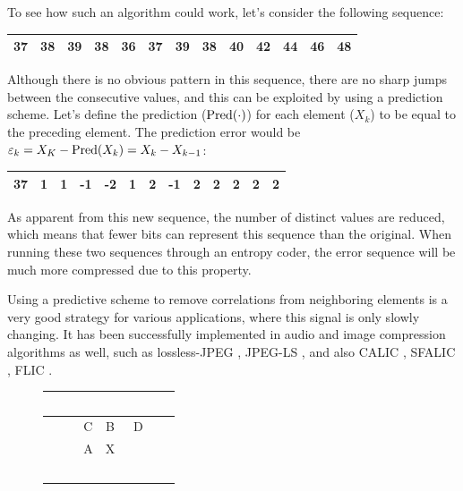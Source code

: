      To see how such an algorithm could work, let's consider the following sequence:
      \begin{center}
        \begin{tabular}{|c|c|c|c|c|c|c|c|c|c|c|c|c|}
          \hline
          37 & 38 & 39 & 38 & 36 & 37 & 39 & 38 & 40 & 42 & 44 & 46 & 48 \\
          \hline
        \end{tabular}
      \end{center}
      Although there is no obvious pattern in this sequence, there are no sharp jumps between the consecutive values, and this can be exploited by using a prediction scheme. Let's define the prediction ($\operatorname{Pred}(\cdot)$) for each element ($X_k$) to be equal to the preceding element. The prediction error would be $\varepsilon_k = X_K - \operatorname{Pred}(X_k) = X_k - X_{k-1}$:
      \begin{center}
        \begin{tabular}{|c|c|c|c|c|c|c|c|c|c|c|c|c|}
          \hline
          37 & 1 & 1 & -1 & -2 & 1 & 2 & -1 & 2 & 2 & 2 & 2 & 2 \\
          \hline
        \end{tabular}
      \end{center}
      As apparent from this new sequence, the number of distinct values are reduced, which means that fewer bits can represent this sequence than the original. When running these two sequences through an entropy coder, the error sequence will be much more compressed due to this property.
      
      Using a predictive scheme to remove correlations from neighboring elements is a very good strategy for various applications, where this signal is only slowly changing. It has been successfully implemented in audio and image compression algorithms as well, such as lossless-JPEG \cite{pennebaker_jpeg:_1992}, JPEG-LS \cite{weinberger_loco-i_2000}, and also CALIC \cite{wu_context-based_1997}, SFALIC \cite{starosolski_simple_2007}, FLIC \cite{wang_fast_2012}.
  
      \begin{figure}
        \centering
        \begin{tabular}{|c|c|c|c|c}
          \hline
          \rowcolor{gray!25}
          \ \ \ & \ & \ & \ \ \ & \ \\ \hline
          \rowcolor{gray!25}
          \ & C & B & D & \ \\ \hline
          \cellcolor{gray!25} \ & \cellcolor{gray!25}A & \cellcolor{green!25}X & \ & \ \\ \hline
          \ & \ & \ & \ & \ \\
        \end{tabular}
        \label{fig:context}
      \end{figure}

